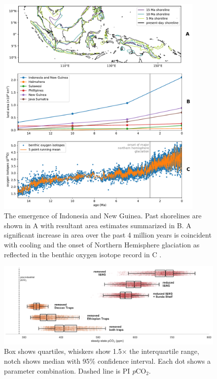 \documentclass[11pt,letterpaper]{article}
\newcommand{\pCOtwo}{\textit{p}CO$_{2}$\xspace}
\begin{document}
\begin{figure}[h!]
    \centering
    \includegraphics[width=0.9\textwidth]{Manuscript/Figures/shoreline_growth.pdf}
    \caption{The emergence of Indonesia and New Guinea. Past shorelines are shown in A with resultant area estimates summarized in B. A significant increase in area over the past 4 million years is coincident with cooling and the onset of Northern Hemisphere glaciation as reflected in the benthic oxygen isotope record in C \citep{Zachos2008a}.}
    \label{fig:shoreline_growth}
\end{figure}

\begin{figure}[h!]
    \centering
    \includegraphics[width=1\textwidth]{Manuscript/Figures/scenario_pCO2.pdf}
    \caption{Box shows quartiles, whiskers show 1.5$\times$ the interquartile range, notch shows median with 95\% confidence interval. Each dot shows a parameter combination. Dashed line is PI \pCOtwo.}
    \label{fig:scenario_pCO2}
\end{figure}

\clearpage
\newpage
\footnotesize

\singlespacing



\end{document}

